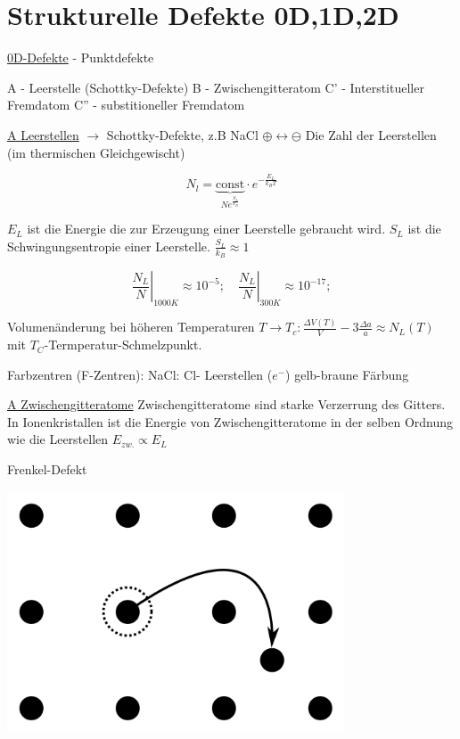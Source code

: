 \chapter{Strukturelle Defekte 0D,1D,2D}



\underline{0D-Defekte} - Punktdefekte


A - Leerstelle (Schottky-Defekte)
B - Zwischengitteratom
C' - Interstitueller Fremdatom
C'' - substitioneller Fremdatom

\underline{A Leerstellen} \(\rightarrow\) Schottky-Defekte, z.B NaCl \(\oplus \leftrightarrow \ominus\)
Die Zahl der Leerstellen (im thermischen Gleichgewischt)

\[ N_l = \underbrace{\text{const}}_{Ne^{\frac{S_L}{k_B}}}\cdot e^{-\frac {E_L}{k_B T}}\]

\(E_L\) ist die Energie die zur Erzeugung einer Leerstelle gebraucht
wird. \(S_L\) ist die Schwingungsentropie einer Leerstelle. \(\frac
{S_L}{k_B}\approx 1\)

\[ \left.\frac{N_L}{N}\right|_{1000K}\approx 10^{-5}; \quad
\left.\frac{N_L}{N}\right|_{300K}\approx 10^{-17};\]

Volumenänderung bei höheren Temperaturen \(T \rightarrow T_c:\frac
{\Delta V(T)}{V}-3\frac{\Delta a}{a} \approx N_L(T)\) mit
\(T_C\)-Termperatur-Schmelzpunkt. 

Farbzentren (F-Zentren): 
NaCl: Cl- Leerstellen (\(e^-\)) gelb-braune Färbung

\underline{A Zwischengitteratome}
Zwischengitteratome sind starke Verzerrung des Gitters. In
Ionenkristallen ist die Energie von Zwischengitteratome in der selben
Ordnung wie die Leerstellen \(E_{zw.}\propto E_L\)

Frenkel-Defekt


\includegraphics[width=0.75\textwidth]{kap04_01.png}

